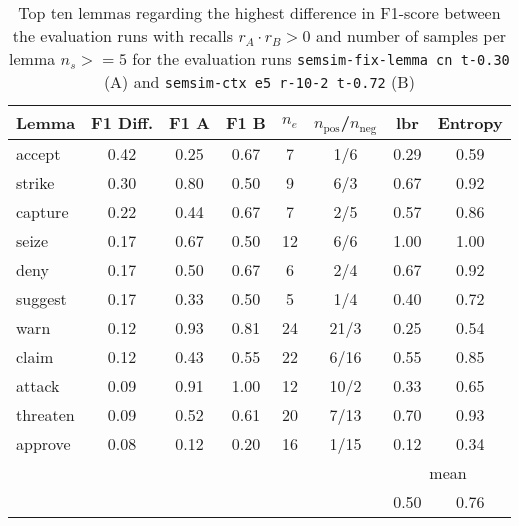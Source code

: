 \documentclass[11pt]{scrreprt}
\begin{document}
{\begin{table}[p]
\centering
\begin{tabular}{lccccccc}
\toprule
Lemma      & F1 Diff. & F1 A & F1 B & \(n_e\) & \(n_\text{pos}\)/\(n_\text{neg}\) & \gls{lbr} & Entropy \\
\midrule
accept     & 0.42      & 0.25           & 0.67           & 7               & 1/6     & 0.29 & 0.59 \\
strike     & 0.30      & 0.80           & 0.50           & 9               & 6/3     & 0.67 & 0.92 \\
capture    & 0.22      & 0.44           & 0.67           & 7               & 2/5     & 0.57 & 0.86 \\
seize      & 0.17      & 0.67           & 0.50           & 12              & 6/6     & 1.00 & 1.00 \\
deny       & 0.17      & 0.50           & 0.67           & 6               & 2/4     & 0.67 & 0.92 \\
suggest    & 0.17      & 0.33           & 0.50           & 5               & 1/4     & 0.40 & 0.72 \\
warn       & 0.12      & 0.93           & 0.81           & 24              & 21/3    & 0.25 & 0.54 \\
claim      & 0.12      & 0.43           & 0.55           & 22              & 6/16    & 0.55 & 0.85 \\
attack     & 0.09      & 0.91           & 1.00           & 12              & 10/2    & 0.33 & 0.65 \\
threaten   & 0.09      & 0.52           & 0.61           & 20              & 7/13    & 0.70 & 0.93 \\
approve    & 0.08      & 0.12           & 0.20           & 16              & 1/15    & 0.12 & 0.34 \\
\cmidrule{7-8}
\multicolumn{6}{l}{} & \multicolumn{2}{c}{mean} \\
\multicolumn{6}{l}{} & 0.50 & 0.76 \\
\bottomrule
\end{tabular}
\caption{Top ten lemmas regarding the highest difference in F1-score between the evaluation runs with recalls \(r_A \cdot r_B > 0\) and number of samples per lemma \(n_s >= 5\) for the evaluation runs \texttt{semsim-fix-lemma cn t-0.30} (A) and \texttt{semsim-ctx e5 r-10-2 t-0.72} (B)}
\label{tab:predicate-lemma-highest-f1-both-recall-non-zero}
\end{table}


}
\end{document}
